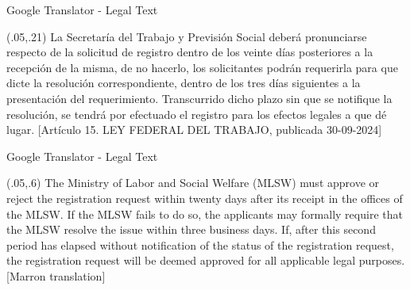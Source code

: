 \documentclass{beamer}
\begin{document}
\begin{frame} {Google Translator - Legal Text}
\begin{textblock}{1}(.05,.21)
  \footnotesize {La Secretar\'ia del Trabajo y Previsi\'on Social deber\'a pronunciarse respecto de la solicitud de registro
dentro de los veinte d\'ias posteriores a la recepci\'on de la misma, de no hacerlo, los solicitantes podr\'an
requerirla para que dicte la resoluci\'on correspondiente, dentro de los tres d\'ias siguientes a la
presentaci\'on del requerimiento. Transcurrido dicho plazo sin que se notifique la resoluci\'on, se tendr\'a por
efectuado el registro para los efectos legales a que d\'e lugar. [Art\'iculo 15. LEY FEDERAL DEL TRABAJO, publicada 30-09-2024] }
\end{textblock}

\end{frame}

\begin{frame} {Google Translator - Legal Text}
 
 \begin{textblock}{1}(.05,.6)
  \footnotesize {The Ministry of Labor and Social Welfare (MLSW) must approve or reject the registration request within twenty days after its receipt in the offices of the MLSW. If the MLSW fails to do so, the applicants may formally require that the MLSW resolve the issue within three business days. If, after this second period has elapsed without notification of the status of the registration request, the registration request will be deemed approved for all applicable legal purposes. [Marron translation]}
\end{textblock}
 
\end{frame}
\end{document}
